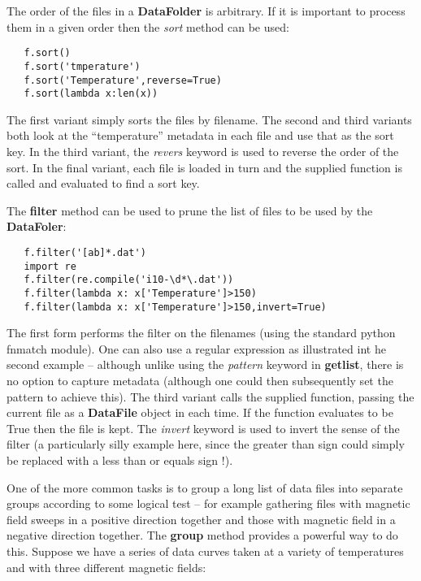 \documentclass[a4paper,11pt]{scrartcl}
\begin{document}
The order of the files in a \textbf{DataFolder} is arbitrary. If it is important to process them in a given order then the \textit{sort} method can be used:

\begin{lstlisting}
   f.sort()
   f.sort('tmperature')
   f.sort('Temperature',reverse=True)
   f.sort(lambda x:len(x))
\end{lstlisting}

The first variant simply sorts the files by filename. The second and third variants both look at the ``temperature'' metadata in each file and use that as the sort key. In the third variant, the \textit{revers} keyword is used to reverse the order of the sort. In the final variant, each file is loaded in turn and the supplied function is called and evaluated to find a sort key.

The \textbf{filter} method can be used to prune the list of files to be used by the \textbf{DataFoler}:

\begin{lstlisting}
   f.filter('[ab]*.dat')
   import re
   f.filter(re.compile('i10-\d*\.dat'))
   f.filter(lambda x: x['Temperature']>150)
   f.filter(lambda x: x['Temperature']>150,invert=True)
\end{lstlisting}

The first form performs the filter on the filenames (using the standard python fnmatch module). One can also use a regular expression as illustrated int he second example -- although unlike using the \textit{pattern} keyword in \textbf{getlist}, there is no option to capture metadata (although one could then subsequently set the pattern to achieve this). The third variant calls the supplied function, passing the current file as a \textbf{DataFile} object in each time. If the function evaluates to be True then the file is kept. The \textit{invert} keyword is used to invert the sense of the filter (a particularly silly example here, since the greater than sign could simply be replaced with a less than or equals sign !).

One of the more common tasks is to group a long list of data files into separate groups according to some logical test --  for example gathering files with magnetic field sweeps in a positive direction together and those with magnetic field in a negative direction together. The \textbf{group} method provides a powerful way to do this. Suppose we have a series of data curves taken at a variety of temperatures and with three different magnetic fields:
\end{document}
